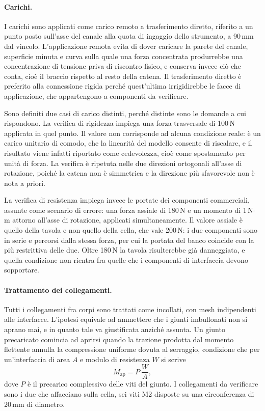 \paragraph{Carichi.}
I carichi sono applicati come carico remoto a trasferimento diretto, riferito a
un punto posto sull'asse del canale alla quota di ingaggio dello strumento, a
90\,mm dal vincolo. L'applicazione remota evita di dover caricare la parete del
canale, superficie minuta e curva sulla quale una forza concentrata
produrrebbe una concentrazione di tensione priva di riscontro fisico, e conserva
invece ciò che conta, cioè il braccio rispetto al resto della catena. Il
trasferimento diretto è preferito alla connessione rigida perché quest'ultima
irrigidirebbe le facce di applicazione, che appartengono a componenti da
verificare.

Sono definiti due casi di carico distinti, perché distinte sono le domande a cui
rispondono. La verifica di rigidezza impiega una forza trasversale di 100\,N
applicata in quel punto. Il valore non corrisponde ad alcuna condizione reale:
è un carico unitario di comodo, che la linearità del modello consente di
riscalare, e il risultato viene infatti riportato come cedevolezza, cioè come
spostamento per unità di forza. La verifica è ripetuta nelle due direzioni
ortogonali all'asse di rotazione, poiché la catena non è simmetrica e la
direzione più sfavorevole non è nota a priori.

La verifica di resistenza impiega invece le portate dei componenti commerciali,
assunte come scenario di errore: una forza assiale di 180\,N e un momento di
1\,N$\cdot$m attorno all'asse di rotazione, applicati simultaneamente. Il valore
assiale è quello della tavola e non quello della cella, che vale 200\,N: i due
componenti sono in serie e percorsi dalla stessa forza, per cui la portata del
banco coincide con la più restrittiva delle due. Oltre 180\,N la tavola
risulterebbe già danneggiata, e quella condizione non rientra fra quelle che i
componenti di interfaccia devono sopportare.

\paragraph{Trattamento dei collegamenti.}
Tutti i collegamenti fra corpi sono trattati come incollati, con mesh
indipendenti alle interfacce. L'ipotesi equivale ad ammettere che i giunti
imbullonati non si aprano mai, e in quanto tale va giustificata anziché assunta.
Un giunto precaricato comincia ad aprirsi quando la trazione prodotta dal
momento flettente annulla la compressione uniforme dovuta al serraggio,
condizione che per un'interfaccia di area $A$ e modulo di resistenza $W$ si
scrive
\begin{equation}
    M_{\mathrm{ap}} = P \, \frac{W}{A} ,
\end{equation}
dove $P$ è il precarico complessivo delle viti del giunto. I collegamenti da
verificare sono i due che affacciano sulla cella, sei viti M2 disposte su una
circonferenza di 20\,mm di diametro.

